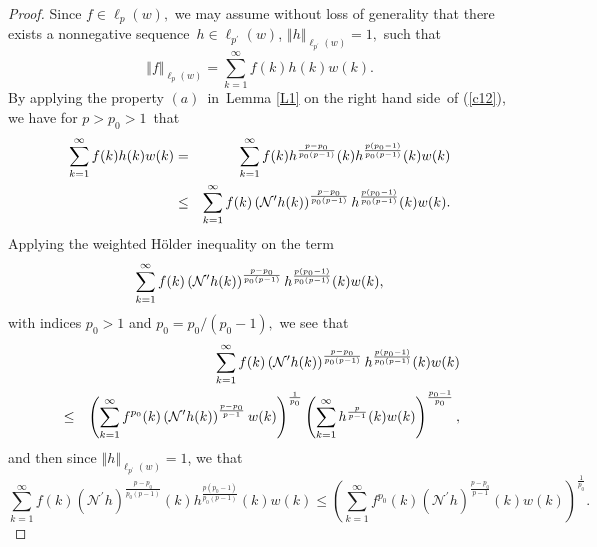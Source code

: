 \documentclass[a4paper]{amsart}
\theoremstyle{plain}
\numberwithin{equation}{section}
\begin{document}
\begin{proof}
Since $f\in \ell _{p}(w),$ we may assume without loss of generality that
there exists a nonnegative sequence\ $h\in \ell _{p^{\prime }}(w)$, $%
\left\Vert h\right\Vert _{\ell _{p^{\prime }}(w)}=1,$ such that%
\begin{equation}
\left\Vert f\right\Vert _{\ell _{p}(w)}=\sum_{k=1}^{\infty }f(k)h(k)w(k).
\label{c12}
\end{equation}%
By applying the property $(a)$\ in\ Lemma \ref{L1} on the right hand side\
of (\ref{c12}), we have for $p>p_{0}>1$\ that%
\begin{eqnarray}
\sum_{k=1}^{\infty }f(k)h(k)w(k) &=&\sum_{k=1}^{\infty }f(k)h^{\frac{p-p_{0}%
}{p_{0}\left( p-1\right) }}(k)h^{\frac{p\left( p_{0}-1\right) }{p_{0}\left(
p-1\right) }}(k)w(k)  \notag \\
&\leq &\sum_{k=1}^{\infty }f(k)\left( \mathcal{N}^{\prime }h(k)\right) ^{%
\frac{p-p_{0}}{p_{0}\left( p-1\right) }}h^{\frac{p\left( p_{0}-1\right) }{%
p_{0}\left( p-1\right) }}(k)w(k).  \label{c13}
\end{eqnarray}%
Applying the weighted H\"{o}lder inequality on the term%
\begin{equation*}
\sum_{k=1}^{\infty }f(k)\left( \mathcal{N}^{\prime }h(k)\right) ^{\frac{%
p-p_{0}}{p_{0}\left( p-1\right) }}h^{\frac{p\left( p_{0}-1\right) }{%
p_{0}\left( p-1\right) }}(k)w(k),
\end{equation*}%
with indices $p_{0}>1$ and $p_{0}=p_{0}/\left( p_{0}-1\right) ,$ we see that%
\begin{eqnarray*}
&&\sum_{k=1}^{\infty }f(k)\left( \mathcal{N}^{\prime }h(k)\right) ^{\frac{%
p-p_{0}}{p_{0}\left( p-1\right) }}h^{\frac{p\left( p_{0}-1\right) }{%
p_{0}\left( p-1\right) }}(k)w(k) \\
&\leq &\left( \sum_{k=1}^{\infty }f^{p_{0}}(k)\left( \mathcal{N}^{\prime
}h(k)\right) ^{\frac{p-p_{0}}{p-1}}w(k)\right) ^{\frac{1}{p_{0}}}\left(
\sum_{k=1}^{\infty }h^{\frac{p}{p-1}}(k)w(k)\right) ^{\frac{p_{0}-1}{p_{0}}},
\end{eqnarray*}%
and then since $\left\Vert h\right\Vert _{\ell _{p^{\prime }}(w)}=1$, we that%
\begin{equation}
\sum_{k=1}^{\infty }f(k)\left( \mathcal{N}^{\prime }h\right) ^{\frac{p-p_{0}%
}{p_{0}\left( p-1\right) }}(k)h^{\frac{p\left( p_{0}-1\right) }{p_{0}\left(
p-1\right) }}(k)w(k)\leq \left( \sum_{k=1}^{\infty }f^{p_{0}}(k)\left( 
\mathcal{N}^{\prime }h\right) ^{\frac{p-p_{0}}{p-1}}(k)w(k)\right) ^{\frac{1%
}{p_{0}}}.  \label{c14}
\end{equation}%

\end{proof}
\end{document}
